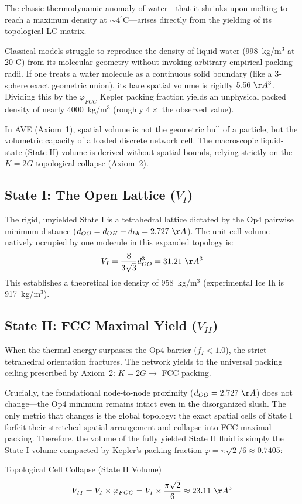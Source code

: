 The classic thermodynamic anomaly of water---that it shrinks upon melting to reach a maximum density at $\sim 4^\circ$C---arises directly from the yielding of its topological LC matrix. 

Classical models struggle to reproduce the density of liquid water (998~kg/m$^3$ at 20$^\circ$C) from its molecular geometry without invoking arbitrary empirical packing radii. If one treats a water molecule as a continuous solid boundary (like a 3-sphere exact geometric union), its bare spatial volume is rigidly $5.56\ \AA^3$. Dividing this by the $\varphi_{FCC}$ Kepler packing fraction yields an unphysical packed density of nearly 4000~kg/m$^3$ (roughly $4\times$ the observed value).

In AVE (Axiom~1), spatial volume is not the geometric hull of a particle, but the volumetric capacity of a loaded discrete network cell. The macroscopic liquid-state (State II) volume is derived without spatial bounds, relying strictly on the $K=2G$ topological collapse (Axiom~2).

\subsection{State I: The Open Lattice ($V_I$)}
The rigid, unyielded State I is a tetrahedral lattice dictated by the Op4 pairwise minimum distance ($d_{OO} = d_{OH} + d_{hb} = 2.727\ \AA$). The unit cell volume natively occupied by one molecule in this expanded topology is:
\begin{equation}
    V_I = \frac{8}{3\sqrt{3}} d_{OO}^3 = 31.21\ \AA^3
\end{equation}
This establishes a theoretical ice density of 958~kg/m$^3$ (experimental Ice Ih is 917~kg/m$^3$).

\subsection{State II: FCC Maximal Yield ($V_{II}$)}
When the thermal energy surpasses the Op4 barrier ($f_I < 1.0$), the strict tetrahedral orientation fractures. The network yields to the universal packing ceiling prescribed by Axiom~2: $K=2G \rightarrow$ FCC packing.

Crucially, the foundational node-to-node proximity ($d_{OO} = 2.727\ \AA$) does not change---the Op4 minimum remains intact even in the disorganized slush. The only metric that changes is the global topology: the exact spatial cells of State I forfeit their stretched spatial arrangement and collapse into FCC maximal packing. Therefore, the volume of the fully yielded State II fluid is simply the State I volume compacted by Kepler's packing fraction $\varphi = \pi\sqrt{2}/6 \approx 0.7405$:
\begin{resultbox}{Topological Cell Collapse (State II Volume)}
\begin{equation}
    V_{II} = V_I \times \varphi_{FCC} = V_I \times \frac{\pi\sqrt{2}}{6} \approx 23.11\ \AA^3
\end{equation}
\end{resultbox}

